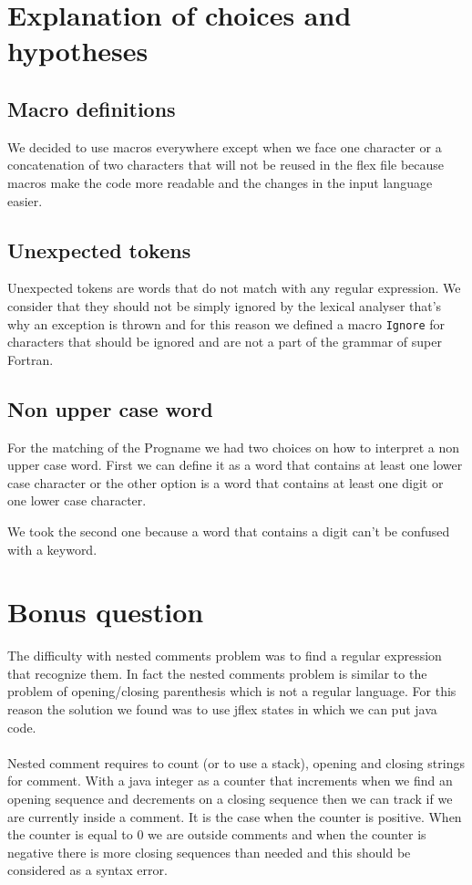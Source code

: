 \documentclass[12pt]{article}
\begin{document}
\section{Explanation of choices and hypotheses}

\subsection{Macro definitions}
We decided to use macros everywhere except when we face one character or a concatenation of two characters
that will not be reused in the flex file because macros make the code more readable and the changes 
in the input language easier.

\subsection{Unexpected tokens}
Unexpected tokens are words that do not match with any regular expression. 
We consider that they
should not be simply ignored by the lexical analyser that's why an exception is thrown
and for this reason
we defined a macro \texttt{Ignore} for characters that should be ignored and are not a part of 
the grammar of super Fortran.

\subsection{Non upper case word}
For the matching of the Progname we had two choices on how to interpret a non upper case word.
First we can define it as a word that contains at least one lower case character or the other option
is a word that contains at least one digit or one lower case character.

We took the second one because a word that contains a digit can't be confused with a keyword.



\section{Bonus question}
The difficulty with nested comments problem was to find a regular expression that recognize them.
In fact the nested comments problem is similar to the problem of opening/closing parenthesis which is not a 
regular language. For this reason the solution we found was to use jflex states in which we can put
java code.

\paragraph{}
Nested comment requires to count (or to use a stack), opening and closing strings for comment. 
With a java integer as a counter that increments when we find an opening sequence and decrements
on a closing sequence then we can track if we are
currently inside a comment. It is the case when the counter is positive. When the counter is equal to 0
we are outside comments and when the counter is negative there is more closing sequences than needed and this 
should be considered as a syntax error.
\end{document}
